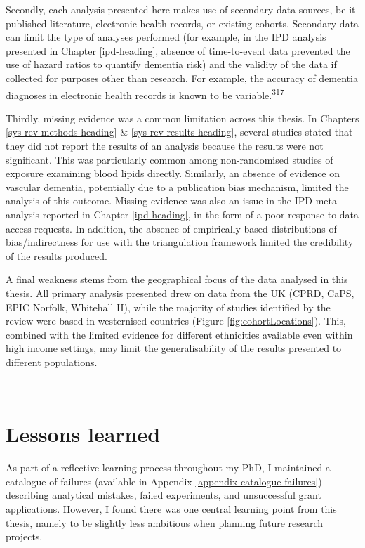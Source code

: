 \documentclass[a4paper, twoside]{templates/ociamthesis}
\begin{document}
Secondly, each analysis presented here makes use of secondary data sources, be it published literature, electronic health records, or existing cohorts. Secondary data can limit the type of analyses performed (for example, in the IPD analysis presented in Chapter \ref{ipd-heading}, absence of time-to-event data prevented the use of hazard ratios to quantify dementia risk) and the validity of the data if collected for purposes other than research. For example, the accuracy of dementia diagnoses in electronic health records is known to be variable.\textsuperscript{\protect\hyperlink{ref-wilkinson2018}{317}}

Thirdly, missing evidence was a common limitation across this thesis. In Chapters \ref{sys-rev-methods-heading} \& \ref{sys-rev-results-heading}, several studies stated that they did not report the results of an analysis because the results were not significant. This was particularly common among non-randomised studies of exposure examining blood lipids directly. Similarly, an absence of evidence on vascular dementia, potentially due to a publication bias mechanism, limited the analysis of this outcome. Missing evidence was also an issue in the IPD meta-analysis reported in Chapter \ref{ipd-heading}, in the form of a poor response to data access requests. In addition, the absence of empirically based distributions of bias/indirectness for use with the triangulation framework limited the credibility of the results produced.

A final weakness stems from the geographical focus of the data analysed in this thesis. All primary analysis presented drew on data from the UK (CPRD, CaPS, EPIC Norfolk, Whitehall II), while the majority of studies identified by the review were based in westernised countries (Figure \ref{fig:cohortLocations}). This, combined with the limited evidence for different ethnicities available even within high income settings, may limit the generalisability of the results presented to different populations.

~

\hypertarget{lessons-learned}{%
\section{Lessons learned}\label{lessons-learned}}

As part of a reflective learning process throughout my PhD, I maintained a catalogue of failures (available in Appendix \ref{appendix-catalogue-failures}) describing analytical mistakes, failed experiments, and unsuccessful grant applications. However, I found there was one central learning point from this thesis, namely to be slightly less ambitious when planning future research projects.
\end{document}
